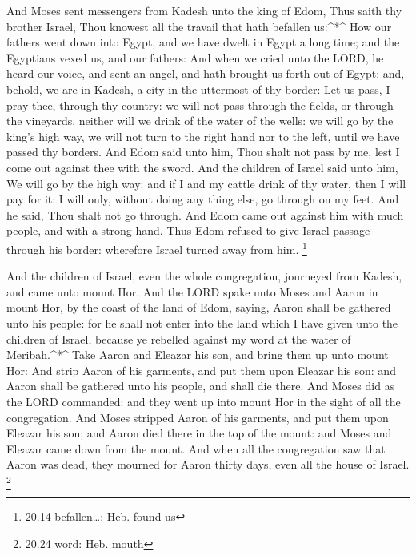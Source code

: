  And Moses sent messengers from Kadesh unto the king of
Edom, Thus saith thy brother Israel, Thou knowest all the travail that
hath befallen us:\^{}*\^{}  How our fathers went down into
Egypt, and we have dwelt in Egypt a long time; and the Egyptians vexed
us, and our fathers:  And when we cried unto the LORD, he
heard our voice, and sent an angel, and hath brought us forth out of
Egypt: and, behold, we are in Kadesh, a city in the uttermost of thy
border:  Let us pass, I pray thee, through thy country: we
will not pass through the fields, or through the vineyards, neither will
we drink of the water of the wells: we will go by the king's high way,
we will not turn to the right hand nor to the left, until we have passed
thy borders.  And Edom said unto him, Thou shalt not pass
by me, lest I come out against thee with the sword.  And
the children of Israel said unto him, We will go by the high way: and if
I and my cattle drink of thy water, then I will pay for it: I will only,
without doing any thing else, go through on my feet.  And
he said, Thou shalt not go through. And Edom came out against him with
much people, and with a strong hand.  Thus Edom refused to
give Israel passage through his border: wherefore Israel turned away
from him. \footnote{20.14 befallen\ldots: Heb. found us}

 And the children of Israel, even the whole congregation,
journeyed from Kadesh, and came unto mount Hor.  And the
LORD spake unto Moses and Aaron in mount Hor, by the coast of the land
of Edom, saying,  Aaron shall be gathered unto his people:
for he shall not enter into the land which I have given unto the
children of Israel, because ye rebelled against my word at the water of
Meribah.\^{}*\^{}  Take Aaron and Eleazar his son, and
bring them up unto mount Hor:  And strip Aaron of his
garments, and put them upon Eleazar his son: and Aaron shall be gathered
unto his people, and shall die there.  And Moses did as the
LORD commanded: and they went up into mount Hor in the sight of all the
congregation.  And Moses stripped Aaron of his garments,
and put them upon Eleazar his son; and Aaron died there in the top of
the mount: and Moses and Eleazar came down from the mount. 
And when all the congregation saw that Aaron was dead, they mourned for
Aaron thirty days, even all the house of Israel. \footnote{20.24 word:
  Heb. mouth}

